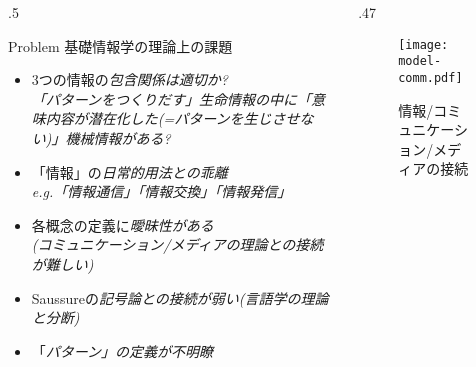 \begin{columns}[onlytextwidth,t]
\begin{column}{.5\hsize}
\begin{block}{Problem}
基礎情報学の理論上の課題
\begin{itemize}
\item 3つの情報の\em{包含関係}は適切か? \\ 「パターンをつくりだす」生命情報の中に「意味内容が潜在化した(=パターンを生じさせない)」機械情報がある?
\item 「情報」の\em{日常的用法}との乖離 \\ e.g.「情報通信」「情報交換」「情報発信」
\item 各概念の定義に\em{曖昧性}がある \\ (コミュニケーション/メディアの理論との接続が難しい)
\item Saussureの\em{記号論}\cite{saussure}との接続が弱い(言語学の理論と分断)
\item 「\em{パターン}」の定義が不明瞭
\end{itemize}
\end{block}
\end{column}
\begin{column}{.47\hsize}
\begin{figure}[hbtp]{\centering
\texttt{[image: model-comm.pdf]}
\caption{情報/コミュニケーション/メディアの接続\cite{ohnishi}}
}\end{figure}
\end{column}
\end{columns}

